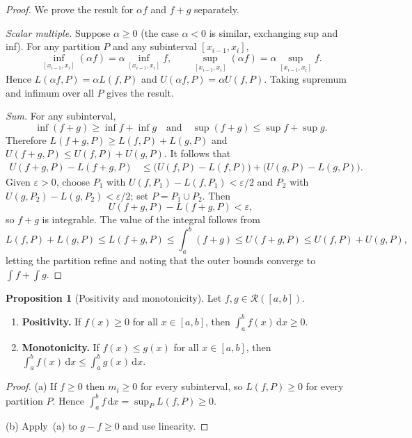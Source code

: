 \documentclass[12pt,a4paper]{book}
\theoremstyle{definition}
\newtheorem{proposition}{Proposition}[chapter]
\newcommand{\eps}{\varepsilon}
\newcommand{\dd}{\,\mathrm{d}}
\begin{document}
\begin{proof}
  We prove the result for $\alpha f$ and $f+g$ separately.

  \emph{Scalar multiple.}\;
  Suppose $\alpha\ge0$ (the case $\alpha<0$ is similar, exchanging sup
  and inf).  For any partition $P$ and any subinterval $[x_{i-1},x_i]$,
  \[
    \inf_{[x_{i-1},x_i]}(\alpha f) = \alpha\inf_{[x_{i-1},x_i]}f,
    \qquad
    \sup_{[x_{i-1},x_i]}(\alpha f) = \alpha\sup_{[x_{i-1},x_i]}f.
  \]
  Hence $L(\alpha f,P)=\alpha L(f,P)$ and $U(\alpha f,P)=\alpha U(f,P)$.
  Taking supremum and infimum over all $P$ gives the result.

  \emph{Sum.}\;
  For any subinterval,
  \[
    \inf(f+g) \ge \inf f + \inf g
    \quad\text{and}\quad
    \sup(f+g) \le \sup f + \sup g.
  \]
  Therefore $L(f+g,P)\ge L(f,P)+L(g,P)$ and
  $U(f+g,P)\le U(f,P)+U(g,P)$.  It follows that
  \begin{align*}
    U(f+g,P)-L(f+g,P)
    &\le \bigl(U(f,P)-L(f,P)\bigr)+\bigl(U(g,P)-L(g,P)\bigr).
  \end{align*}
  Given $\eps>0$, choose $P_1$ with $U(f,P_1)-L(f,P_1)<\eps/2$ and
  $P_2$ with $U(g,P_2)-L(g,P_2)<\eps/2$; set $P=P_1\cup P_2$.  Then
  \[
    U(f+g,P)-L(f+g,P) < \eps,
  \]
  so $f+g$ is integrable.  The value of the integral follows from
  \[
    L(f,P)+L(g,P) \le L(f+g,P) \le \int_a^b(f+g) \le U(f+g,P)
    \le U(f,P)+U(g,P),
  \]
  letting the partition refine and noting that the outer bounds converge
  to $\int f + \int g$.
\end{proof}

\begin{proposition}[Positivity and monotonicity]\label{prop:positivity}
  Let $f,g\in\mathcal{R}([a,b])$.
  \begin{enumerate}[label=(\alph*)]
    \item \textbf{Positivity.}\; If $f(x)\ge0$ for all $x\in[a,b]$, then
      $\displaystyle\int_a^b f(x)\dd x\ge0$.
    \item \textbf{Monotonicity.}\; If $f(x)\le g(x)$ for all $x\in[a,b]$,
      then $\displaystyle\int_a^b f(x)\dd x\le\int_a^b g(x)\dd x$.
  \end{enumerate}
\end{proposition}

\begin{proof}
  (a) If $f\ge0$ then $m_i\ge0$ for every subinterval, so
  $L(f,P)\ge0$ for every partition $P$.  Hence
  $\int_a^b f\dd x=\sup_P L(f,P)\ge0$.

  (b) Apply~(a) to $g-f\ge0$ and use linearity.
\end{proof}
\end{document}
